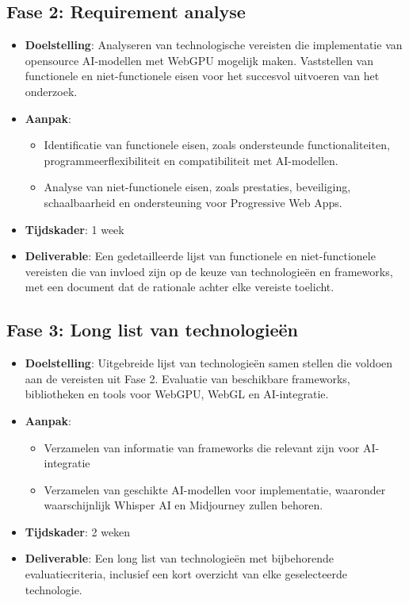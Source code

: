 \subsection*{Fase 2: Requirement analyse}

\begin{itemize}
  \item \textbf{Doelstelling}: Analyseren van technologische vereisten die implementatie van opensource AI-modellen met WebGPU mogelijk maken. Vaststellen van functionele en niet-func\-tio\-ne\-le eisen voor het succesvol uitvoeren van het onderzoek.

  \item \textbf{Aanpak}:
  \begin{itemize}
    \item Identificatie van functionele eisen, zoals ondersteunde functionaliteiten, programmeerflexibiliteit en compatibiliteit met AI-modellen.
    \item Analyse van niet-functionele eisen, zoals prestaties, beveiliging, schaalbaarheid en ondersteuning voor Progressive Web Apps.
  \end{itemize}

  \item \textbf{Tijdskader}: 1 week
  \item \textbf{Deliverable}: Een gedetailleerde lijst van functionele en niet-func\-tio\-ne\-le vereisten die van invloed zijn op de keuze van technologieën en frameworks, met een document dat de rationale achter elke vereiste toelicht.
\end{itemize}

\subsection*{Fase 3: Long list van technologieën}
\begin{itemize}
  \item \textbf{Doelstelling}: Uitgebreide lijst van technologieën samen stellen die voldoen aan de vereisten uit Fase 2. Evaluatie van beschikbare frameworks, bibliotheken en tools voor WebGPU, WebGL en AI-integratie.

  \item \textbf{Aanpak}:
  \begin{itemize}
    \item Verzamelen van informatie van frameworks die relevant zijn voor AI-integratie
    \item Verzamelen van geschikte AI-modellen voor implementatie, waaronder waarschijnlijk Whisper AI en Midjourney zullen behoren.
  \end{itemize}

  \item \textbf{Tijdskader}: 2 weken
  \item \textbf{Deliverable}: Een long list van technologieën met bijbehorende evaluatiecriteria, inclusief een kort overzicht van elke geselecteerde technologie.
\end{itemize}

